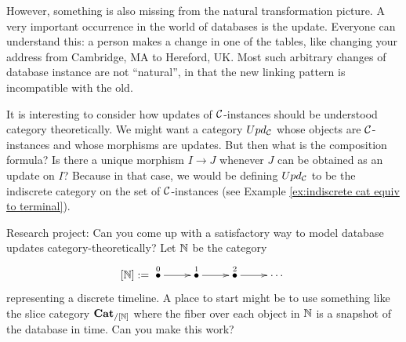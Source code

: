 \documentclass[CT4S-EN-RU]{subfiles}
\begin{document}
\begin{blockRUS}
\end{blockRUS}

\begin{blockENG}
However, something is also missing from the natural transformation picture. A very important occurrence in the world of databases is the update. Everyone can understand this: a person makes a change in one of the tables, like changing your address from Cambridge, MA to Hereford, UK. Most such arbitrary changes of database instance are not “natural”, in that the new linking pattern is incompatible with the old.
\end{blockENG}

\begin{blockRUS}
\end{blockRUS}

\begin{blockENG}
It is interesting to consider how updates of $\mathcal{C}$-instances should be understood category theoretically. We might want a category $Upd_\mathcal{C}$ whose objects are $\mathcal{C}$-instances and whose morphisms are updates. But then what is the composition formula? Is there a unique morphism $I\to J$ whenever $J$ can be obtained as an update on $I$? Because in that case, we would be defining $Upd_\mathcal{C}$ to be the indiscrete category on the set of $\mathcal{C}$-instances (see Example \ref{ex:indiscrete cat equiv to terminal}).
\end{blockENG}

\begin{blockRUS}
\end{blockRUS}

\begin{exerciseENG}
Research project: Can you come up with a satisfactory way to model database updates category-theoretically? Let ${\mathbb N}$ be the category
$$[\NN]:=\xymatrix{\LMO{0}\ar[r]&\LMO{1}\ar[r]&\LMO{2}\ar[r]&\cdots}$$ 
representing a discrete timeline. A place to start might be to use something like the slice category ${\bf Cat}_{/[{\mathbb N}]}$ where the fiber over each object in ${\mathbb N}$ is a snapshot of the database in time. Can you make this work?
\end{exerciseENG}

\begin{exerciseRUS}
\end{exerciseRUS}


\subsection{}\label{sec:equivalence of cats}
\end{document}

